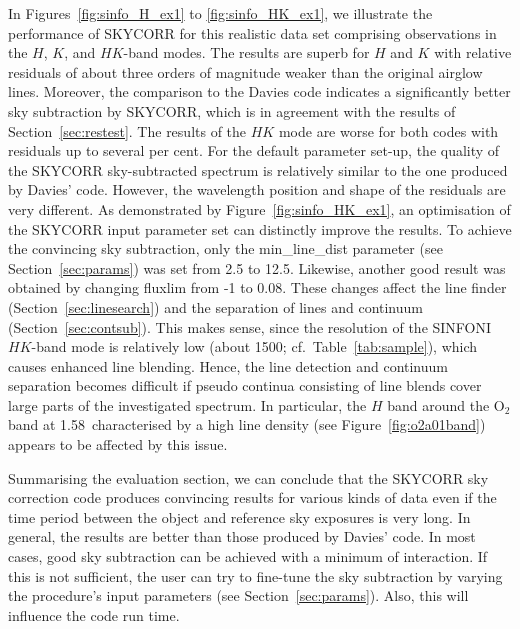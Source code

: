 In Figures~\ref{fig:sinfo_H_ex1} to \ref{fig:sinfo_HK_ex1}, we illustrate the
performance of SKYCORR for this realistic data set comprising observations in
the $H$, $K$, and $HK$-band modes. The results are superb for $H$ and $K$ with
relative residuals of about three orders of magnitude weaker than the original
airglow lines. Moreover, the comparison to the Davies code indicates a
significantly better sky subtraction by SKYCORR, which is in agreement with the
results of Section~\ref{sec:restest}. The results of the $HK$ mode are worse
for both codes with residuals up to several per cent. For the default parameter
set-up, the quality of the SKYCORR sky-subtracted spectrum is relatively
similar to the one produced by Davies' code. However, the wavelength position
and shape of the residuals are very different. As demonstrated by
Figure~\ref{fig:sinfo_HK_ex1}, an optimisation of the SKYCORR input parameter
set can distinctly improve the results. To achieve the convincing sky
subtraction, only the {\sc min\_line\_dist} parameter (see
Section~\ref{sec:params}) was set from 2.5 to 12.5. Likewise, another good
result was obtained by changing {\sc fluxlim} from -1 to 0.08. These changes
affect the line finder (Section~\ref{sec:linesearch}) and the separation of
lines and continuum (Section~\ref{sec:contsub}). This makes sense, since the
resolution of the SINFONI $HK$-band mode is relatively low (about 1500;
cf.~Table~\ref{tab:sample}), which causes enhanced line blending. Hence,
the line detection and continuum separation becomes difficult if pseudo
continua consisting of line blends cover large parts of the investigated
spectrum. In particular, the $H$ band around the O$_2$ band at 1.58\,\mum{}
characterised by a high line density (see Figure~\ref{fig:o2a01band}) appears
to be affected by this issue.

Summarising the evaluation section, we can conclude that the SKYCORR sky
correction code produces convincing results for various kinds of data even if
the time period between the object and reference sky exposures is very long. In
general, the results are better than those produced by Davies' code. In most
cases, good sky subtraction can be achieved with a minimum of interaction. If
this is not sufficient, the user can try to fine-tune the sky subtraction by
varying the procedure's input parameters (see Section~\ref{sec:params}). Also,
this will influence the code run time.
